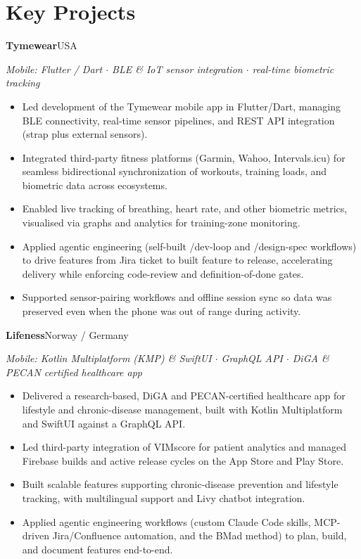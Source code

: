 \documentclass[a4paper,10pt]{article}
\newcommand{\entry}[2]{\textbf{#1}\hfill{\small #2}\par}
\begin{document}
\section*{Key Projects}
\entry{Tymewear}{USA}
{\small\itshape Mobile: Flutter / Dart $\cdot$ BLE \& IoT sensor integration $\cdot$ real-time biometric tracking}
\begin{itemize}
  \item Led development of the Tymewear mobile app in Flutter/Dart, managing BLE connectivity, real-time sensor pipelines, and REST API integration (strap plus external sensors).
  \item Integrated third-party fitness platforms (Garmin, Wahoo, Intervals.icu) for seamless bidirectional synchronization of workouts, training loads, and biometric data across ecosystems.
  \item Enabled live tracking of breathing, heart rate, and other biometric metrics, visualised via graphs and analytics for training-zone monitoring.
  \item Applied agentic engineering (self-built /dev-loop and /design-spec workflows) to drive features from Jira ticket to built feature to release, accelerating delivery while enforcing code-review and definition-of-done gates.
  \item Supported sensor-pairing workflows and offline session sync so data was preserved even when the phone was out of range during activity.
\end{itemize}
\entry{Lifeness}{Norway / Germany}
{\small\itshape Mobile: Kotlin Multiplatform (KMP) \& SwiftUI $\cdot$ GraphQL API $\cdot$ DiGA \& PECAN certified healthcare app}
\begin{itemize}
  \item Delivered a research-based, DiGA and PECAN-certified healthcare app for lifestyle and chronic-disease management, built with Kotlin Multiplatform and SwiftUI against a GraphQL API.
  \item Led third-party integration of VIMscore for patient analytics and managed Firebase builds and active release cycles on the App Store and Play Store.
  \item Built scalable features supporting chronic-disease prevention and lifestyle tracking, with multilingual support and Livy chatbot integration.
  \item Applied agentic engineering workflows (custom Claude Code skills, MCP-driven Jira/Confluence automation, and the BMad method) to plan, build, and document features end-to-end.
\end{itemize}
\end{document}
